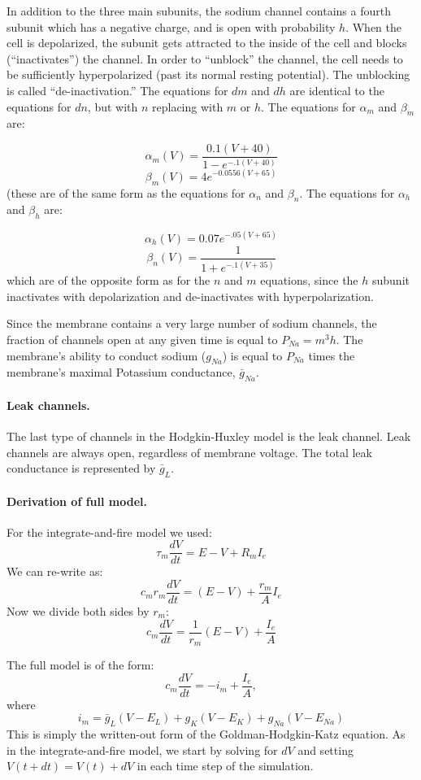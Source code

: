 \documentclass[11pt]{article}
\begin{document}
In addition to the three main subunits, the sodium channel contains a fourth subunit which has a negative charge, and is open with probability $h$.  When the cell is depolarized, the subunit gets attracted to the inside of the cell and blocks (``inactivates'') the channel.  In order to ``unblock'' the channel, the cell needs to be sufficiently hyperpolarized (past its normal resting potential).  The unblocking is called ``de-inactivation.''  The equations for $dm$ and $dh$ are identical to the equations for $dn$, but with $n$ replacing with $m$ or $h$.  The equations for $\alpha_m$ and $\beta_m$ are:

\[
\alpha_m(V) = \frac{0.1(V+40)}{1 - e^{-.1(V+40)}}
\]
\[
\beta_m(V) = 4e^{-0.0556(V + 65)}
\]
(these are of the same form as the equations for $\alpha_n$ and $\beta_n$.  The equations for $\alpha_h$ and $\beta_h$ are:

\[
\alpha_h(V) = 0.07e^{-.05(V+65)}
\]
\[
\beta_n(V) = \frac{1}{1 + e^{-.1(V+35)}}
\]
which are of the opposite form as for the $n$ and $m$ equations, since the $h$ subunit inactivates with depolarization and de-inactivates with hyperpolarization.

Since the membrane contains a very large number of sodium channels, the fraction of channels open at any given time is equal to $P_{Na} = m^3h$.  The membrane's ability to conduct sodium ($g_{Na}$) is equal to $P_{Na}$ times the membrane's maximal Potassium conductance, $\bar{g}_{Na}$.

\paragraph{Leak channels.}  The last type of channels in the Hodgkin-Huxley model is the leak channel.  Leak channels are always open, regardless of membrane voltage.  The total leak conductance is represented by $\bar{g}_L$.

\paragraph{Derivation of full model.}
For the integrate-and-fire model we used:
\[
\tau_m\frac{dV}{dt} = E - V + R_mI_e
\]
We can re-write as:
\[
c_mr_m\frac{dV}{dt} = (E - V) + \frac{r_m}{A}I_e
\]
Now we divide both sides by $r_m$:
\[
c_m\frac{dV}{dt} = \frac{1}{r_m}(E - V) + \frac{I_e}{A}
\]

The full model is of the form:
\[
c_m\frac{dV}{dt} = -i_m + \frac{I_e}{A},
\]
where
\[
i_m = \bar{g}_L(V - E_L) + g_K(V - E_K) + g_{Na}(V - E_{Na})
\]
This is simply the written-out form of the Goldman-Hodgkin-Katz equation.  As in the integrate-and-fire model, we start by solving for $dV$ and setting $V(t+dt) = V(t) + dV$ in each time step of the simulation.
\end{document}
